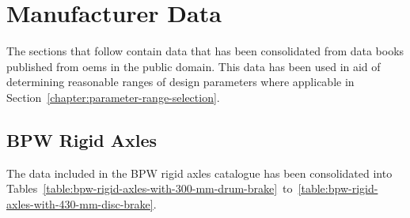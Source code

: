\chapter{Manufacturer Data}\label{appendix:manufacturer-data}
The sections that follow contain data that has been consolidated from data books published from \glspl{oem} in the public domain. This data has been used in aid of determining reasonable ranges of design parameters where applicable in Section~\ref{chapter:parameter-range-selection}.

\section{BPW Rigid Axles}\label{section:bpw-rigid-axles-catalogue}
The data included in the BPW rigid axles catalogue has been consolidated into Tables~\ref{table:bpw-rigid-axles-with-300-mm-drum-brake}~to~\ref{table:bpw-rigid-axles-with-430-mm-disc-brake}.

